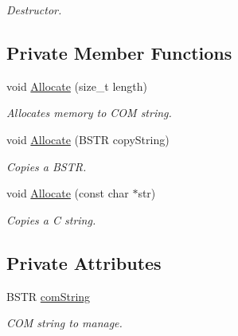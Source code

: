 \begin{DoxyCompactItemize}
\begin{DoxyCompactList}\small\item\em Destructor. \item\end{DoxyCompactList}\end{DoxyCompactItemize}
\subsection*{Private Member Functions}
\begin{DoxyCompactItemize}
\item 
void \hyperlink{class_com_string_a38137b4f26fb6609f7d348066576c0aa}{Allocate} (size\_\-t length)
\begin{DoxyCompactList}\small\item\em Allocates memory to COM string. \item\end{DoxyCompactList}\item 
void \hyperlink{class_com_string_a198f3d4bdb627d75a2f802b5a84b2ab4}{Allocate} (BSTR copyString)
\begin{DoxyCompactList}\small\item\em Copies a BSTR. \item\end{DoxyCompactList}\item 
void \hyperlink{class_com_string_a13d02797fb190c69e34fcb3e2a80dd3f}{Allocate} (const char $\ast$str)
\begin{DoxyCompactList}\small\item\em Copies a C string. \item\end{DoxyCompactList}\end{DoxyCompactItemize}
\subsection*{Private Attributes}
\begin{DoxyCompactItemize}
\item 
\hypertarget{class_com_string_abb5366fea86915d7718f59e24af31103}{
BSTR \hyperlink{class_com_string_abb5366fea86915d7718f59e24af31103}{comString}}
\label{class_com_string_abb5366fea86915d7718f59e24af31103}

\begin{DoxyCompactList}\small\item\em COM string to manage. \item\end{DoxyCompactList}\end{DoxyCompactItemize}



